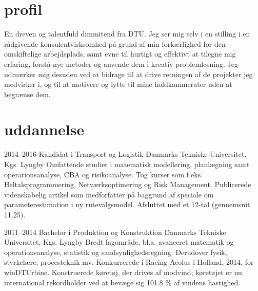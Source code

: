 \documentclass[]{friggeri-cv} %
\begin{document}

\section{profil}
En dreven og talentfuld dimmitend fra DTU. Jeg ser mig selv i en stilling i en rådgivende konsulentvirksomhed på grund af  min forkærlighed for den omskiftelige arbejdsplads, samt evne til hurtigt og effektivt at tilegne mig erfaring, forstå  nye metoder og anvende dem  i kreativ problemløsning. Jeg udmærker mig desuden ved  at bidrage til at drive retningen af de projekter jeg medvirker i, og til at motivere og lytte til mine holdkammerater   uden at begrænse dem.

\section{uddannelse}
\begin{entrylist}
\entry
{2014--2016}
{Kandidat {\normalfont i Transport og Logistik}}
{Danmarks Tekniske Universitet, Kgs. Lyngby}
{Omfattende studier i matematisk modellering, planlægning samt operationsanalyse, CBA og risikoanalyse. Tog kurser som f.eks. Heltalsprogrammering, Netværksoptimering og Risk Management. Publicerede videnskabelig artikel  som medforfatter på baggrund af speciale om parameterestimation i ny rutevalgsmodel. Afsluttet med et 12-tal (gennemsnit 11.25).
}


\entry
{2011--2014}
{Bachelor {\normalfont i Produktion og Konstruktion}}
{Danmarks Tekniske Universitet, Kgs. Lyngby}
{Bredt fagområde, bl.a. avanceret matematik og operationsanalyse, statistik og sandsynlighedsregning. Derudover fysik, styrkelære, procesteknik mv. Konkurrerede i Racing Aeolus  i Holland, 2014, for winDTUrbine. Konstruerede køretøj, der drives af modvind; køretøjet er nu international rekordholder ved at bevæge sig 101.8 \% af vindens hastighed.}

\end{entrylist}

\end{document}
